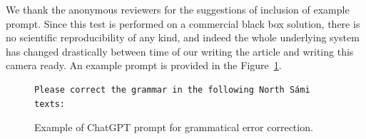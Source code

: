 \documentclass[free]{flammie}
\begin{document}
We thank the anonymous reviewers for the suggestions of inclusion of example
prompt. Since this test is performed on a commercial black box solution, there
is no scientific reproducibility of any kind, and indeed the whole underlying
system has changed drastically between time of our writing the article and
writing this camera ready. An example prompt is provided in the
Figure~\ref{prompt}.

\begin{figure}
    \begin{tcolorbox}[colframe=black, colback=white]
\scriptsize
    \begin{verbatim}
Please correct the grammar in the following North Sámi texts:
    \end{verbatim}
    \caption{Example of ChatGPT prompt for grammatical error
    correction.\label{prompt}}
    \end{tcolorbox}
\end{figure}



\end{document}
